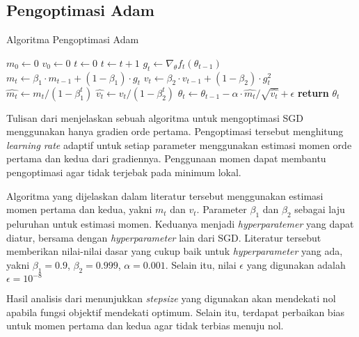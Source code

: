 \subsection{Pengoptimasi Adam}
\begin{algorithm}
  \caption{Algoritma Pengoptimasi Adam}\label{Adam}
  \begin{algorithmic}[1]
    \State $m_0 \gets 0$ 
    \State $v_0 \gets 0$ 
    \State $t \gets 0$ 
    \State $t \gets t+1$
    \State $g_t \gets \nabla_\theta f_t (\theta_{t-1})$
    \State $m_t \gets \beta_1 \cdot m_{t-1} + (1 - \beta_1) \cdot g_t$ 
    \State $v_t \gets \beta_2 \cdot v_{t-1} + (1-\beta_2) \cdot g_t^2$ 
    \State $\hat{m_t} \gets m_t/(1-\beta_1^t)$ 
    \State $\hat{v_t} \gets v_t/(1-\beta_2^t)$ 
    \State $\theta_t \gets \theta_{t-1} - \alpha \cdot \hat{m_t}/\sqrt{\hat{v_t}}+\epsilon$
    \EndWhile
    \State \textbf{return} $\theta_t$ 
    \EndFunction
  \end{algorithmic}
\end{algorithm}

Tulisan dari \textcite{ADAMKingma} menjelaskan sebuah algoritma untuk mengoptimasi SGD menggunakan hanya gradien orde pertama. Pengoptimasi tersebut menghitung \emph{learning rate} adaptif untuk setiap parameter menggunakan estimasi momen orde pertama dan kedua dari gradiennya. Penggunaan momen dapat membantu pengoptimasi agar tidak terjebak pada minimum lokal.

Algoritma yang dijelaskan dalam literatur tersebut menggunakan estimasi momen pertama dan kedua, yakni $m_t$ dan $v_t$. Parameter $\beta_1$ dan $\beta_2$ sebagai laju peluruhan untuk estimasi momen. Keduanya menjadi \emph{hyperparatemer} yang dapat diatur, bersama dengan \emph{hyperparameter} lain dari SGD. Literatur tersebut memberikan nilai-nilai dasar yang cukup baik untuk \emph{hyperparameter} yang ada, yakni $\beta_1 = 0.9$, $\beta_2 = 0.999$, $\alpha = 0.001$. Selain itu, nilai $\epsilon$ yang digunakan adalah $\epsilon = 10^{-8}$

Hasil analisis dari \textcite{ADAMKingma} menunjukkan \emph{stepsize} yang digunakan akan mendekati nol apabila fungsi objektif mendekati optimum. Selain itu, terdapat perbaikan bias untuk momen pertama dan kedua agar tidak terbias menuju nol.

